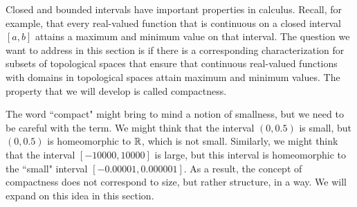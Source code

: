 \label{chap:Compact_topology}


\vspace*{-17 pt}

\vspace*{13 pt}

\label{sec_compact_top_intro}

Closed and bounded intervals have important properties in calculus. Recall, for example, that every real-valued function that is continuous on a closed interval $[a, b]$ attains a maximum and minimum value on that interval. The question we want to address in this section is if there is a corresponding characterization for subsets of topological spaces that ensure that continuous real-valued functions with domains in topological spaces attain maximum and minimum values. The property that we will develop is called compactness.

The word ``compact" might bring to mind a notion of smallness, but we need to be careful with the term. We might think that the interval $(0, 0.5)$ is small, but $(0, 0.5)$ is homeomorphic to $\mathbb{R}$, which is not small. Similarly, we might think that the interval $[-10000, 10000]$ is large, but this interval is homeomorphic to the ``small" interval $[-0.00001, 0.000001]$. As a result, the concept of compactness does not correspond to size, but rather structure, in a way. We will expand on this idea in this section. 

